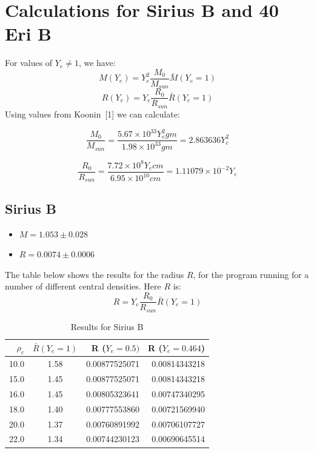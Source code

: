 \documentclass[a4paper]{IEEEtran}
\begin{document}
\section{Calculations for Sirius B and 40 Eri B} 
For values of $Y_e \not= 1$, we have:
\[ M(Y_e) = Y_{e}^2 \frac{M_0}{M_{sun}} \bar{M}(Y_e = 1)\]
\[ R(Y_e) = Y_e \frac{R_0}{R_{sun}} \bar{R}(Y_e = 1)\]
Using values from Koonin~[1] we can calculate:

\[ \frac{M_0}{M_{sun}} = 
    \frac{5.67 \times 10^{33} Y_e^2 gm}{1.98 \times 10^{33} gm} =  2.863636 Y_e^2\]

\[ \frac{R_0}{R_{sun}} = 
    \frac{7.72 \times 10^8 Y_e cm}{6.95 \times 10^{10} cm} = 1.11079 \times 10^{-2} Y_e\]

\subsection{Sirius B}
\begin{itemize}
    \item $M = 1.053 \pm 0.028$
    \item $R = 0.0074 \pm 0.0006$
\end{itemize}
The table below shows the results for the radius $R$, for the program
running for a number of different central densities. Here $R$ is:
    \[ R = Y_e \frac{R_0}{R_{sun}} \bar{R}(Y_e = 1) \]

\begin{table} 
\caption{Results for Sirius B} 
\label{tbl:results-sirius-b} 
\begin{center}
\begin{tabular}{r|crr} \hline
$\rho_c$    &   $\bar{R}(Y_e=1)$   & R ($Y_e = 0.5)$ & R ($Y_e = 0.464$)\\ \hline
10.0        &   1.58        & 0.00877525071    & 0.00814343218   \\
15.0        &   1.45        & 0.00877525071    & 0.00814343218   \\ 
16.0        &   1.45        & 0.00805323641    & 0.00747340295 \\
18.0        &   1.40        & 0.00777553860    & 0.00721569940\\ 
20.0        &   1.37        & 0.00760891992    & 0.00706107727   \\ 
22.0        &   1.34        & 0.00744230123    & 0.00690645514  \\ \hline
\end{tabular}
\end{center}
\end{table} 
\end{document}
